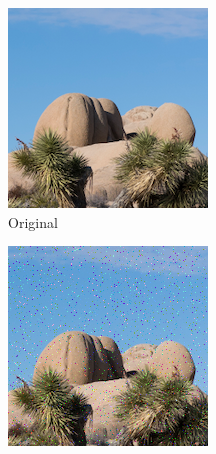 \documentclass{article}
\begin{document}
\begin{figure}[htb]
    \centering
    \begin{subfigure}[b]{0.32\textwidth}
        \centering
        \includegraphics[width=\textwidth]{../Resource/cropped-image.png}
        \caption{Original}
        \label{fig:cropped-image-cyclic-15-11-original}
    \end{subfigure}
    \hfill
    \begin{subfigure}[b]{0.32\textwidth}
        \centering
        \includegraphics[width=\textwidth]{../Result/Cyclic/15-11/cropped-cyclic-bsc-output.png}

\end{subfigure}
\end{figure}
\end{document}
